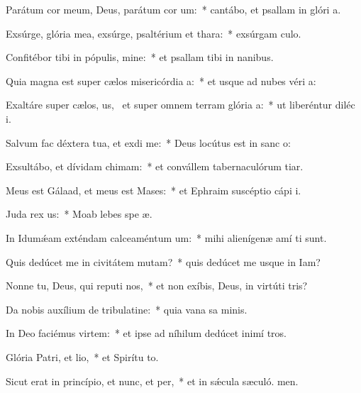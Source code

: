 \item Parátum cor meum, Deus, parátum cor um:~* cantábo, et psallam in glóri a.
\item Exsúrge, glória mea, exsúrge, psaltérium et thara:~* exsúrgam culo.
\item Confitébor tibi in pópulis, mine:~* et psallam tibi in nanibus.
\item Quia magna est super cælos misericórdia a:~* et usque ad nubes véri a:
\item Exaltáre super cælos, us,~\pscross{} et super omnem terram glória a:~* ut liberéntur diléc i.
\item Salvum fac déxtera tua, et exdi me:~* Deus locútus est in sanc o:
\item Exsultábo, et dívidam chimam:~* et convállem tabernaculórum tiar.
\item Meus est Gálaad, et meus est Mases:~* et Ephraim suscéptio cápi i.
\item Juda rex us:~* Moab lebes spe æ.
\item In Idumǽam exténdam calceaméntum um:~* mihi alienígenæ amí ti sunt.
\item Quis dedúcet me in civitátem mutam?~* quis dedúcet me usque in Iam?
\item Nonne tu, Deus, qui reputi nos,~* et non exíbis, Deus, in virtúti tris?
\item Da nobis auxílium de tribulatine:~* quia vana sa minis.
\item In Deo faciémus virtem:~* et ipse ad níhilum dedúcet inimí tros.
\item Glória Patri, et lio,~* et Spirítu to.
\item Sicut erat in princípio, et nunc, et per,~* et in sǽcula sæculó. men.

